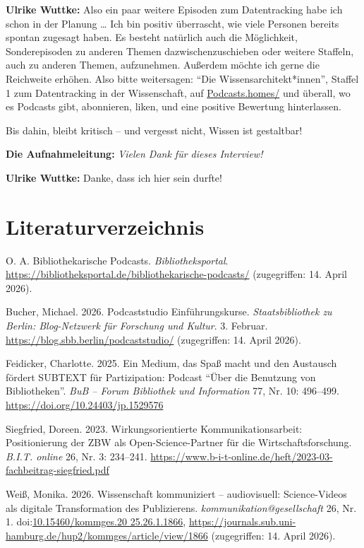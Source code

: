 \documentclass[a4paper,
fontsize=11pt,
oneside,
numbers=noperiodatend,
parskip=half-,
bibliography=totoc,
final
]{scrartcl}
\begin{document}
\textbf{Ulrike Wuttke:} Also ein paar weitere Episoden zum Datentracking
habe ich schon in der Planung \ldots{} Ich bin positiv überrascht, wie
viele Personen bereits spontan zugesagt haben. Es besteht natürlich auch
die Möglichkeit, Sonderepisoden zu anderen Themen dazwischenzuschieben
oder weitere Staffeln, auch zu anderen Themen, aufzunehmen. Außerdem
möchte ich gerne die Reichweite erhöhen. Also bitte weitersagen:
\enquote{Die Wissensarchitekt*innen}, Staffel 1 zum Datentracking in der
Wissenschaft, auf \href{https://podcasts.homes}{Podcasts.homes/} und
überall, wo es Podcasts gibt, abonnieren, liken, und eine positive
Bewertung hinterlassen.

Bis dahin, bleibt kritisch -- und vergesst nicht, Wissen ist gestaltbar!

\textbf{Die Aufnahmeleitung:} \emph{Vielen Dank für dieses Interview!}

\textbf{Ulrike Wuttke:} Danke, dass ich hier sein durfte!

\section{Literaturverzeichnis}\label{literaturverzeichnis}

O. A. Bibliothekarische Podcasts. \emph{Bibliotheksportal}.
\url{https://bibliotheksportal.de/bibliothekarische-podcasts/}
(zugegriffen: 14. April 2026).

Bucher, Michael. 2026. Podcaststudio Einführungskurse.
\emph{Staatsbibliothek zu Berlin: Blog-Netzwerk für Forschung und
Kultur}. 3. Februar. \url{https://blog.sbb.berlin/podcaststudio/}
(zugegriffen: 14. April 2026).

Feidicker, Charlotte. 2025. Ein Medium, das Spaß macht und den Austausch
fördert SUBTEXT für Partizipation: Podcast \enquote{Über die Benutzung
von Bibliotheken}. \emph{BuB -- Forum Bibliothek und Information} 77,
Nr. 10: 496--499. \url{https://doi.org/10.24403/jp.1529576}

Siegfried, Doreen. 2023. Wirkungsorientierte Kommunikationsarbeit:
Positionierung der ZBW als Open-Science-Partner für die
Wirtschaftsforschung. \emph{B.I.T. online} 26, Nr. 3: 234--241.
\url{https://www.b-i-t-online.de/heft/2023-03-fachbeitrag-siegfried.pdf}

Weiß, Monika. 2026. Wissenschaft kommuniziert -- audiovisuell:
Science-Videos als digitale \linebreak Transformation des Publizierens.
\emph{kommunikation@gesellschaft} 26, Nr. 1.
doi:\href{https://doi.org/10.15460/kommges.2025.26.1.18666}{10.15460/kommges.20 25.26.1.1866}, \url{https://journals.sub.uni-hamburg.de/hup2/kommges/article/view/1866}
(zugegriffen: 14. April 2026).
\end{document}
